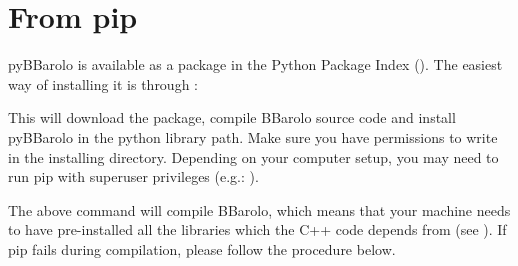 \documentclass[letterpaper,10pt,english]{sphinxmanual}
\begin{document}
\section{From pip}
\label{\detokenize{pybb_install:from-pip}}
pyBBarolo is available as a package in the Python Package Index (). The easiest way of installing it is through :

\begin{sphinxVerbatim}[commandchars=\\\{\}]
   
\end{sphinxVerbatim}

This will download the package, compile BBarolo source code and install pyBBarolo in the python library path. Make sure you have permissions to write in the installing directory. Depending on your computer setup, you may need to run pip with superuser privileges (e.g.: ).

 The above command will compile BBarolo, which means that your machine needs to have pre-installed all the libraries which the C++ code depends from (see {\hyperref[\detokenize{installing:requirements}]{}}). If pip fails during compilation, please follow the procedure below.
\end{document}
